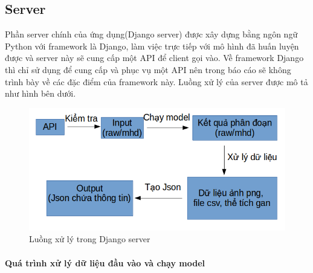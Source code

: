 \subsection{Server}
Phần server chính của ứng dụng(Django server) được xây dựng bằng ngôn ngữ Python với framework là Django, làm việc trực tiếp với mô hình đã huấn luyện được và server này sẽ cung cấp một API để client gọi vào. Về framework Django thì chỉ sử dụng để cung cấp và phục vụ một API nên trong báo cáo sẽ không trình bày về các đặc điểm của framework này. Luồng xử lý của server được mô tả như hình bên dưới.
\begin{figure}[h]
\centering
    \includegraphics[totalheight=7cm]{Images/app_django_struct.png}
    \caption{Luồng xử lý trong Django server}
    \label{skip_conn}
\end{figure}
\paragraph{Quá trình xử lý dữ liệu đầu vào và chạy model\\}

